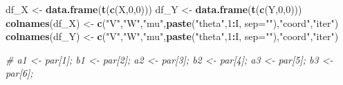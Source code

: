 \documentclass[
]{article}
\newenvironment{Shaded}{\begin{snugshade}}{\end{snugshade}}
\newcommand{\AttributeTok}[1]{\textcolor[rgb]{0.13,0.29,0.53}{#1}}
\newcommand{\CommentTok}[1]{\textcolor[rgb]{0.56,0.35,0.01}{\textit{#1}}}
\newcommand{\DecValTok}[1]{\textcolor[rgb]{0.00,0.00,0.81}{#1}}
\newcommand{\FunctionTok}[1]{\textcolor[rgb]{0.13,0.29,0.53}{\textbf{#1}}}
\newcommand{\NormalTok}[1]{#1}
\newcommand{\OtherTok}[1]{\textcolor[rgb]{0.56,0.35,0.01}{#1}}
\newcommand{\SpecialCharTok}[1]{\textcolor[rgb]{0.81,0.36,0.00}{\textbf{#1}}}
\newcommand{\StringTok}[1]{\textcolor[rgb]{0.31,0.60,0.02}{#1}}
\begin{document}
\begin{Shaded}
\begin{Highlighting}[]
\NormalTok{  df\_X }\OtherTok{\textless{}{-}} \FunctionTok{data.frame}\NormalTok{(}\FunctionTok{t}\NormalTok{(}\FunctionTok{c}\NormalTok{(X,}\DecValTok{0}\NormalTok{,}\DecValTok{0}\NormalTok{)))}
\NormalTok{  df\_Y }\OtherTok{\textless{}{-}} \FunctionTok{data.frame}\NormalTok{(}\FunctionTok{t}\NormalTok{(}\FunctionTok{c}\NormalTok{(Y,}\DecValTok{0}\NormalTok{,}\DecValTok{0}\NormalTok{)))}
  \FunctionTok{colnames}\NormalTok{(df\_X) }\OtherTok{\textless{}{-}} \FunctionTok{c}\NormalTok{(}\StringTok{"V"}\NormalTok{,}\StringTok{"W"}\NormalTok{,}\StringTok{"mu"}\NormalTok{,}\FunctionTok{paste}\NormalTok{(}\StringTok{"theta"}\NormalTok{,}\DecValTok{1}\SpecialCharTok{:}\NormalTok{I, }\AttributeTok{sep=}\StringTok{""}\NormalTok{),}\StringTok{"coord"}\NormalTok{,}\StringTok{"iter"}\NormalTok{)}
  \FunctionTok{colnames}\NormalTok{(df\_Y) }\OtherTok{\textless{}{-}} \FunctionTok{c}\NormalTok{(}\StringTok{"V"}\NormalTok{,}\StringTok{"W"}\NormalTok{,}\StringTok{"mu"}\NormalTok{,}\FunctionTok{paste}\NormalTok{(}\StringTok{"theta"}\NormalTok{,}\DecValTok{1}\SpecialCharTok{:}\NormalTok{I, }\AttributeTok{sep=}\StringTok{""}\NormalTok{),}\StringTok{"coord"}\NormalTok{,}\StringTok{"iter"}\NormalTok{)}

 \CommentTok{\# a1 \textless{}{-} par[1]; b1 \textless{}{-} par[2]; a2 \textless{}{-} par[3]; b2 \textless{}{-} par[4]; a3 \textless{}{-} par[5]; b3 \textless{}{-} par[6];}


\end{Highlighting}
\end{Shaded}
\end{document}
